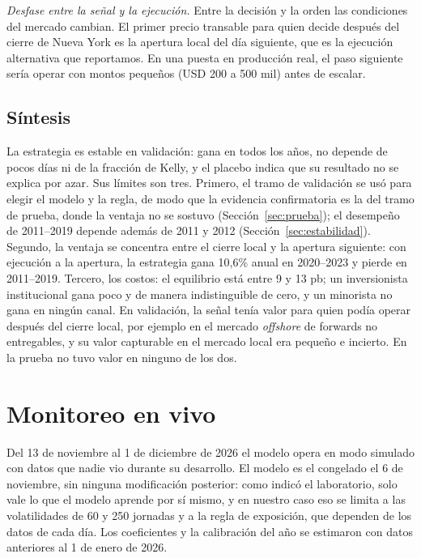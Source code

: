 \documentclass[11pt,a4paper]{article}
\begin{document}
\emph{Desfase entre la señal y la ejecución.} Entre la decisión y la orden las condiciones del mercado cambian. El primer precio transable para quien decide después del cierre de Nueva York es la apertura local del día siguiente, que es la ejecución alternativa que reportamos. En una puesta en producción real, el paso siguiente sería operar con montos pequeños (USD 200 a 500 mil) antes de escalar.

\subsection{Síntesis}
La estrategia es estable en validación: gana en todos los años, no depende de pocos días ni de la fracción de Kelly, y el placebo indica que su resultado no se explica por azar. Sus límites son tres. Primero, el tramo de validación se usó para elegir el modelo y la regla, de modo que la evidencia confirmatoria es la del tramo de prueba, donde la ventaja no se sostuvo (Sección~\ref{sec:prueba}); el desempeño de 2011--2019 depende además de 2011 y 2012 (Sección~\ref{sec:estabilidad}). Segundo, la ventaja se concentra entre el cierre local y la apertura siguiente: con ejecución a la apertura, la estrategia gana 10,6\% anual en 2020--2023 y pierde en 2011--2019. Tercero, los costos: el equilibrio está entre 9 y 13 pb; un inversionista institucional gana poco y de manera indistinguible de cero, y un minorista no gana en ningún canal. En validación, la señal tenía valor para quien podía operar después del cierre local, por ejemplo en el mercado \emph{offshore} de forwards no entregables, y su valor capturable en el mercado local era pequeño e incierto. En la prueba no tuvo valor en ninguno de los dos.

\section{Monitoreo en vivo}\label{sec:monitoreo}
Del 13 de noviembre al 1 de diciembre de 2026 el modelo opera en modo simulado con datos que nadie vio durante su desarrollo. El modelo es el congelado el 6 de noviembre, sin ninguna modificación posterior: como indicó el laboratorio, solo vale lo que el modelo aprende por sí mismo, y en nuestro caso eso se limita a las volatilidades de 60 y 250 jornadas y a la regla de exposición, que dependen de los datos de cada día. Los coeficientes y la calibración del año se estimaron con datos anteriores al 1 de enero de 2026.
\end{document}
